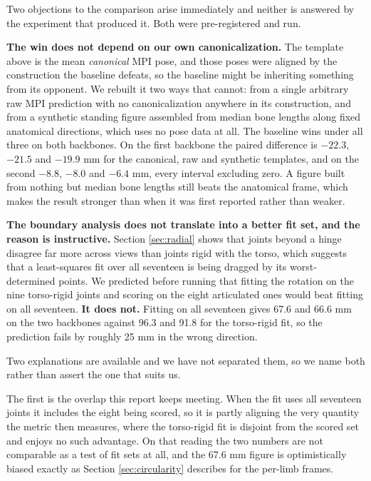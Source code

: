 Two objections to the comparison arise immediately and neither is answered by the experiment that produced it. Both were pre-registered and run.

\textbf{The win does not depend on our own canonicalization.} The template above is the mean \emph{canonical} MPI pose, and those poses were aligned by the construction the baseline defeats, so the baseline might be inheriting something from its opponent. We rebuilt it two ways that cannot: from a single arbitrary raw MPI prediction with no canonicalization anywhere in its construction, and from a synthetic standing figure assembled from median bone lengths along fixed anatomical directions, which uses no pose data at all. The baseline wins under all three on both backbones. On the first backbone the paired difference is $-22.3$, $-21.5$ and $-19.9$ mm for the canonical, raw and synthetic templates, and on the second $-8.8$, $-8.0$ and $-6.4$ mm, every interval excluding zero. A figure built from nothing but median bone lengths still beats the anatomical frame, which makes the result stronger than when it was first reported rather than weaker.

\textbf{The boundary analysis does not translate into a better fit set, and the reason is instructive.} Section \ref{sec:radial} shows that joints beyond a hinge disagree far more across views than joints rigid with the torso, which suggests that a least-squares fit over all seventeen is being dragged by its worst-determined points. We predicted before running that fitting the rotation on the nine torso-rigid joints and scoring on the eight articulated ones would beat fitting on all seventeen. \textbf{It does not.} Fitting on all seventeen gives 67.6 and 66.6 mm on the two backbones against 96.3 and 91.8 for the torso-rigid fit, so the prediction fails by roughly 25 mm in the wrong direction.

Two explanations are available and we have not separated them, so we name both rather than assert the one that suits us.

The first is the overlap this report keeps meeting. When the fit uses all seventeen joints it includes the eight being scored, so it is partly aligning the very quantity the metric then measures, where the torso-rigid fit is disjoint from the scored set and enjoys no such advantage. On that reading the two numbers are not comparable as a test of fit sets at all, and the 67.6 mm figure is optimistically biased exactly as Section \ref{sec:circularity} describes for the per-limb frames.

